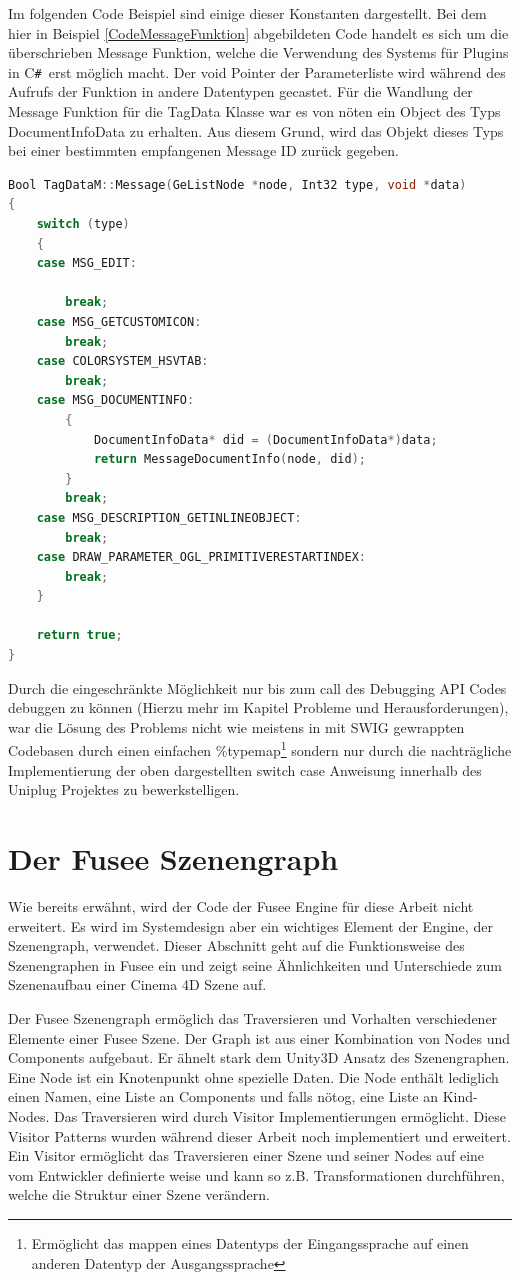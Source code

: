 \documentclass[pagesize, paper=a4, fontsize=12pt, titlepage=true, headings=small, headnosepline, abstractoff, liststotoc, nochapterprefix, plainheadsepline, twoside]{scrreprt}
\newcommand{\CSS}{C\texttt{\# }}
\begin{document}
Im folgenden Code Beispiel sind einige dieser Konstanten dargestellt. Bei dem hier in Beispiel \ref{CodeMessageFunktion} abgebildeten Code handelt es sich um die überschrieben Message Funktion, welche die Verwendung des Systems für Plugins in \CSS erst möglich macht. Der void Pointer der Parameterliste wird während des Aufrufs der Funktion in andere Datentypen gecastet. Für die Wandlung der Message Funktion für die TagData Klasse war es von nöten ein Object des Typs DocumentInfoData zu erhalten. Aus diesem Grund, wird das Objekt dieses Typs bei einer bestimmten empfangenen Message ID zurück gegeben.
\begin{lstlisting}[language=C++, caption = Überschreiben der Message Funktion des TagData Datentyps, label=CodeMessageFunktion]
Bool TagDataM::Message(GeListNode *node, Int32 type, void *data)
{
	switch (type)
	{
	case MSG_EDIT:

		break;
	case MSG_GETCUSTOMICON:
		break;
	case COLORSYSTEM_HSVTAB:
		break;
	case MSG_DOCUMENTINFO:
		{
			DocumentInfoData* did = (DocumentInfoData*)data;
			return MessageDocumentInfo(node, did);
		}
		break;
	case MSG_DESCRIPTION_GETINLINEOBJECT:
		break;
	case DRAW_PARAMETER_OGL_PRIMITIVERESTARTINDEX:
		break;
	}

	return true;
}
\end{lstlisting}

Durch die eingeschränkte  Möglichkeit nur bis zum call des Debugging API Codes debuggen zu können (Hierzu mehr im Kapitel Probleme und Herausforderungen), war die Lösung des Problems nicht wie meistens in mit SWIG gewrappten Codebasen durch einen einfachen \%typemap\footnote{Ermöglicht das mappen eines Datentyps der Eingangssprache auf einen anderen Datentyp der Ausgangssprache} sondern nur durch die nachträgliche Implementierung der oben dargestellten switch case Anweisung innerhalb des Uniplug Projektes zu bewerkstelligen. 

\section{Der Fusee Szenengraph}
Wie bereits erwähnt, wird der Code der Fusee Engine für diese Arbeit nicht erweitert. Es wird im Systemdesign aber ein wichtiges Element der Engine, der Szenengraph, verwendet. Dieser Abschnitt geht auf die Funktionsweise des Szenengraphen in Fusee ein und zeigt seine Ähnlichkeiten und Unterschiede zum Szenenaufbau einer Cinema 4D Szene auf. 

Der Fusee Szenengraph ermöglich das Traversieren und Vorhalten verschiedener Elemente einer Fusee Szene. Der Graph ist aus einer Kombination von Nodes und Components aufgebaut. Er ähnelt stark dem Unity3D Ansatz des Szenengraphen. Eine Node ist ein Knotenpunkt ohne spezielle Daten. Die Node enthält lediglich einen Namen, eine Liste an Components und falls nötog, eine Liste an Kind-Nodes. Das Traversieren wird durch Visitor Implementierungen ermöglicht. Diese Visitor Patterns wurden während dieser Arbeit noch implementiert und erweitert. Ein Visitor ermöglicht das Traversieren einer Szene und seiner Nodes auf eine vom Entwickler definierte weise und kann so z.B. Transformationen durchführen, welche die Struktur einer Szene verändern.
\end{document}
